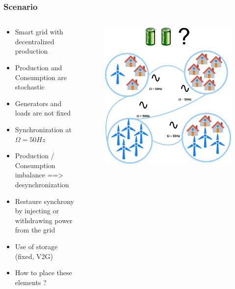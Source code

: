 \documentclass[xcolor=dvipsnames]{beamer}
\begin{document}
\begin{frame}
	\frametitle{Scenario}
	
	\begin{columns}
		\begin{column}{.4\linewidth}
			\begin{scriptsize}
			\begin{itemize}
				\item Smart grid with decentralized production
				\item Production and Consumption are stochastic
				\item Generators and loads are not fixed
				\item Synchronization at $ \Omega=50Hz $
				\item Production / Consumption imbalance ==> desynchronization
				\item Restaure synchrony by injecting or withdrawing power from the grid
				\item Use of storage (fixed, V2G)
				\item How to place these elements ?
			\end{itemize}
			\end{scriptsize}
		\end{column}
		\begin{column}{.6\linewidth}
			\begin{figure}
				\includegraphics[scale=.3]{prosumer.jpg}
			\end{figure}
		\end{column}
	\end{columns}
\end{frame}
\end{document}
